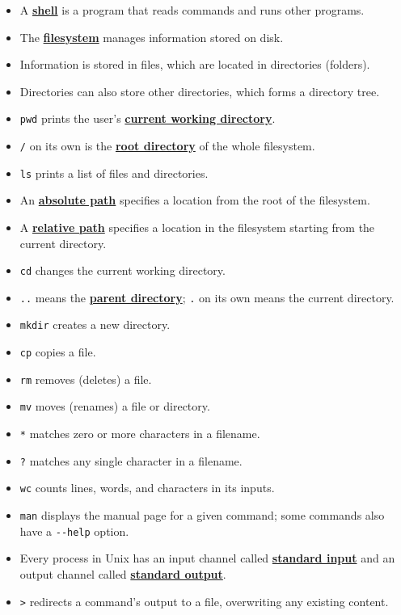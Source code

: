 \documentclass[
]{krantz}
\providecommand{\tightlist}{%
  \setlength{\itemsep}{0pt}\setlength{\parskip}{0pt}}
\newcommand{\gref}[2]{\hyperlink{#2}{\textbf{#1}}}
\begin{document}
\begin{itemize}
\tightlist
\item
  A \gref{shell}{shell} is a program that reads commands and runs other programs.
\item
  The \gref{filesystem}{filesystem} manages information stored on disk.
\item
  Information is stored in files, which are located in directories (folders).
\item
  Directories can also store other directories, which forms a directory tree.
\item
  \texttt{pwd} prints the user's \gref{current working directory}{current\_working\_directory}.
\item
  \texttt{/} on its own is the \gref{root directory}{root\_directory} of the whole filesystem.
\item
  \texttt{ls} prints a list of files and directories.
\item
  An \gref{absolute path}{absolute\_path} specifies a location from the root of the filesystem.
\item
  A \gref{relative path}{relative\_path} specifies a location in the filesystem starting from the current directory.
\item
  \texttt{cd} changes the current working directory.
\item
  \texttt{..} means the \gref{parent directory}{parent\_directory}; \texttt{.} on its own means the current directory.
\item
  \texttt{mkdir} creates a new directory.
\item
  \texttt{cp} copies a file.
\item
  \texttt{rm} removes (deletes) a file.
\item
  \texttt{mv} moves (renames) a file or directory.
\item
  \texttt{*} matches zero or more characters in a filename.
\item
  \texttt{?} matches any single character in a filename.
\item
  \texttt{wc} counts lines, words, and characters in its inputs.
\item
  \texttt{man} displays the manual page for a given command; some commands also have a \texttt{-\/-help} option.
\item
  Every process in Unix has an input channel called \gref{standard input}{stdin}
  and an output channel called \gref{standard output}{stdin}.
\item
  \texttt{\textgreater{}} redirects a command's output to a file, overwriting any existing content.

\end{itemize}
\end{document}
